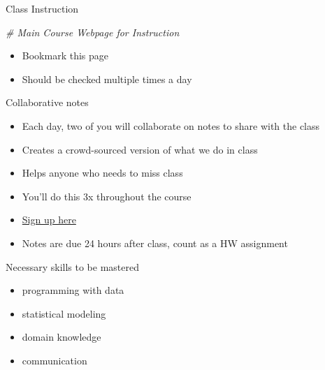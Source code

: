\documentclass[
  10pt,
  ignorenonframetext,
]{beamer}
\newenvironment{Shaded}{\begin{snugshade}}{\end{snugshade}}
\newcommand{\CommentTok}[1]{\textcolor[rgb]{0.56,0.35,0.01}{\textit{#1}}}
\providecommand{\tightlist}{%
  \setlength{\itemsep}{0pt}\setlength{\parskip}{0pt}}
\let\oldShaded\Shaded
\let\endoldShaded\endShaded
\renewenvironment{Shaded}{\tiny\oldShaded}{\endoldShaded}
\begin{document}
\begin{frame}[fragile]{Class Instruction}
\protect\hypertarget{class-instruction}{}
\begin{Shaded}
\begin{Highlighting}[]
\CommentTok{\# Main Course Webpage for Instruction}
\end{Highlighting}
\end{Shaded}


\begin{itemize}
\tightlist
\item
  Bookmark this page
\item
  Should be checked multiple times a day
\end{itemize}
\end{frame}

\begin{frame}{Collaborative notes}
\protect\hypertarget{collaborative-notes}{}
\begin{itemize}
\item Each day, two of you will collaborate on notes to share with the class
\item Creates a crowd-sourced version of what we do in class
\item Helps anyone who needs to miss class
\item You'll do this 3x throughout the course
\item \href{https://drive.google.com/drive/folders/1xgSlButXtTHNvZCi9QkhOv3YSBDeB1UH?usp=sharing}{Sign up here}
\item Notes are due 24 hours after class, count as a HW assignment
\end{itemize}
\end{frame}

\begin{frame}{Necessary skills to be mastered}
\protect\hypertarget{necessary-skills-to-be-mastered}{}
\begin{itemize}
\item
  programming with data
\item
  statistical modeling
\item
  domain knowledge
\item
  communication
\end{itemize}
\end{frame}
\end{document}
